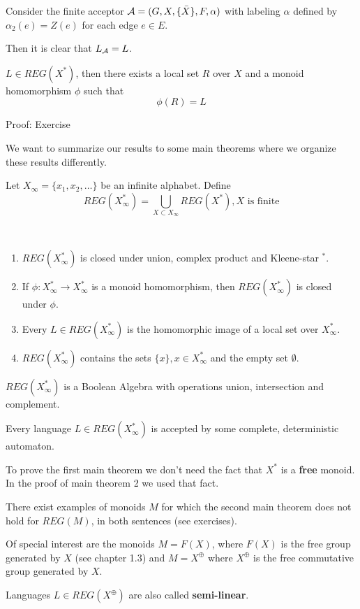 Consider the finite acceptor $\mbox{$\mathcal{A}$} = (G, X, \{\bar{X}\}, F, \alpha)$ with
labeling $\alpha$ defined by $\alpha_2(e) = Z(e)$ for each edge $e \in E$.

Then it is clear that $\mbox{$L_{\mathcal{A}}$} = L$.

\begin{lemma}
$L \in REG(X^*)$, then there exists a local set $R$ over $X$ and a monoid
homomorphism $\phi$ such that \[ \phi(R) = L \]
\end{lemma}

Proof: Exercise

We want to summarize our results to some main theorems where we organize these
results differently.

Let $X_\infty = \{ x_1, x_2, \ldots \}$ be an infinite alphabet. Define \[
REG(X_\infty^*) = \bigcup_{X	\subset X_\infty} REG(X^*), \mbox{$X$ is finite}
\]

\begin{maintheorem}\ \\
\begin{enumerate}
  \item $REG(X_\infty^*)$ is closed under union, complex product and
  Kleene-star $^*$.
  \item If $\phi : X_\infty^* \to X_\infty^*$ is a monoid homomorphism, then
$REG(X_\infty^*)$ is closed under $\phi$.
	\item Every $L \in REG(X_\infty^*)$ is the homomorphic image of a local set
	over $X_\infty^*$.
	\item $REG(X_\infty^*)$	 contains the sets $\{x\}, x \in X_\infty^*$ and the
	empty set $\emptyset$.
\end{enumerate}
\end{maintheorem}

\begin{maintheorem}
$REG(X_\infty^*)$ is a Boolean Algebra with operations union, intersection and
complement. 

Every language $L \in REG(X_\infty^*)$ is accepted by some complete,
deterministic automaton.
\end{maintheorem}

To prove the first main theorem we don't need the fact that $X^*$ is a {\bf
free} monoid. In the proof of main theorem 2 we used that fact.

There exist examples of monoids $M$ for which the second main theorem does not
hold for $REG(M)$, in both sentences (see exercises).

Of special interest are the monoids $M = F(X)$, where $F(X)$ is the free group
generated by $X$ (see chapter 1.3) and $M = X^\oplus$ where $X^\oplus$ is the
free commutative group generated by $X$.

Languages $L \in REG(X^\oplus)$ are also called {\bf semi-linear}.




















